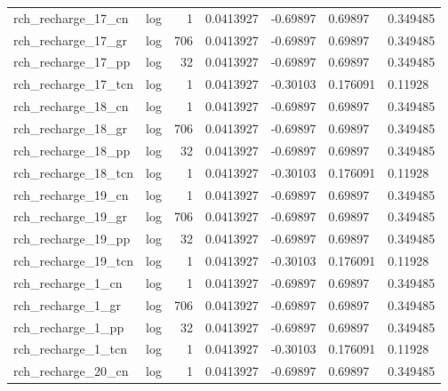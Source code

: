 \documentclass{article}
\begin{document}
\begin{center}
\begin{landscape}
\begin{longtable}{llrllll}
 rch\_recharge\_17\_cn &       log &      1 &      0.0413927 &       -0.69897 &        0.69897 &           0.349485 \\
 rch\_recharge\_17\_gr &       log &    706 &      0.0413927 &       -0.69897 &        0.69897 &           0.349485 \\
 rch\_recharge\_17\_pp &       log &     32 &      0.0413927 &       -0.69897 &        0.69897 &           0.349485 \\
rch\_recharge\_17\_tcn &       log &      1 &      0.0413927 &       -0.30103 &       0.176091 &            0.11928 \\
 rch\_recharge\_18\_cn &       log &      1 &      0.0413927 &       -0.69897 &        0.69897 &           0.349485 \\
 rch\_recharge\_18\_gr &       log &    706 &      0.0413927 &       -0.69897 &        0.69897 &           0.349485 \\
 rch\_recharge\_18\_pp &       log &     32 &      0.0413927 &       -0.69897 &        0.69897 &           0.349485 \\
rch\_recharge\_18\_tcn &       log &      1 &      0.0413927 &       -0.30103 &       0.176091 &            0.11928 \\
 rch\_recharge\_19\_cn &       log &      1 &      0.0413927 &       -0.69897 &        0.69897 &           0.349485 \\
 rch\_recharge\_19\_gr &       log &    706 &      0.0413927 &       -0.69897 &        0.69897 &           0.349485 \\
 rch\_recharge\_19\_pp &       log &     32 &      0.0413927 &       -0.69897 &        0.69897 &           0.349485 \\
rch\_recharge\_19\_tcn &       log &      1 &      0.0413927 &       -0.30103 &       0.176091 &            0.11928 \\
  rch\_recharge\_1\_cn &       log &      1 &      0.0413927 &       -0.69897 &        0.69897 &           0.349485 \\
  rch\_recharge\_1\_gr &       log &    706 &      0.0413927 &       -0.69897 &        0.69897 &           0.349485 \\
  rch\_recharge\_1\_pp &       log &     32 &      0.0413927 &       -0.69897 &        0.69897 &           0.349485 \\
 rch\_recharge\_1\_tcn &       log &      1 &      0.0413927 &       -0.30103 &       0.176091 &            0.11928 \\
 rch\_recharge\_20\_cn &       log &      1 &      0.0413927 &       -0.69897 &        0.69897 &           0.349485 \\

\end{longtable}
\end{landscape}
\end{center}
\end{document}

